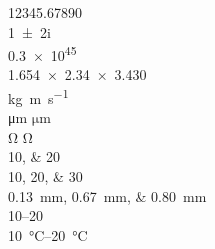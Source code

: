 \documentclass{thuthesis}
\begin{document}
\START
\showoutput

\noindent
\num{12345.67890} \\
\num{1+-2i} \\
\num{.3e45} \\
\num{1.654 x 2.34 x 3.430} \\
\si{kg.m.s^{-1}} \\
\si{\micro\meter} $\si{\micro\meter}$ \\
\si{\ohm} $\si{\ohm}$ \\
\numlist{10;20} \\
\numlist{10;20;30} \\
\SIlist{0.13;0.67;0.80}{\milli\metre} \\
\numrange{10}{20} \\
\SIrange{10}{20}{\degreeCelsius}

\clearpage
\OMIT
\end{document}
